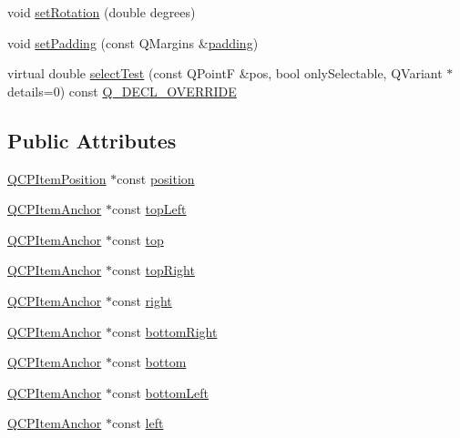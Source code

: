 \begin{DoxyCompactItemize}
\item 
void \mbox{\hyperlink{class_q_c_p_item_text_a4bcc10cd97952c3f749d75824b5077f0}{set\+Rotation}} (double degrees)
\item 
void \mbox{\hyperlink{class_q_c_p_item_text_aeea8a3e01f135f9dd0bb08f51db66310}{set\+Padding}} (const Q\+Margins \&\mbox{\hyperlink{class_q_c_p_item_text_a5a598618350b40446d031fa9dc15fba7}{padding}})
\item 
virtual double \mbox{\hyperlink{class_q_c_p_item_text_a676aaec10ad3cc4d7d0e4847db04c838}{select\+Test}} (const Q\+PointF \&pos, bool only\+Selectable, Q\+Variant $\ast$details=0) const \mbox{\hyperlink{qcustomplot_8h_a42cc5eaeb25b85f8b52d2a4b94c56f55}{Q\+\_\+\+D\+E\+C\+L\+\_\+\+O\+V\+E\+R\+R\+I\+DE}}
\end{DoxyCompactItemize}
\subsection*{Public Attributes}
\begin{DoxyCompactItemize}
\item 
\mbox{\hyperlink{class_q_c_p_item_position}{Q\+C\+P\+Item\+Position}} $\ast$const \mbox{\hyperlink{class_q_c_p_item_text_a0d228a00e819022b5690c65762721129}{position}}
\item 
\mbox{\hyperlink{class_q_c_p_item_anchor}{Q\+C\+P\+Item\+Anchor}} $\ast$const \mbox{\hyperlink{class_q_c_p_item_text_a6354d8762182a3502103fabe5fbb8512}{top\+Left}}
\item 
\mbox{\hyperlink{class_q_c_p_item_anchor}{Q\+C\+P\+Item\+Anchor}} $\ast$const \mbox{\hyperlink{class_q_c_p_item_text_a5c87ee162cbbe3d166b97826c8849304}{top}}
\item 
\mbox{\hyperlink{class_q_c_p_item_anchor}{Q\+C\+P\+Item\+Anchor}} $\ast$const \mbox{\hyperlink{class_q_c_p_item_text_ad18ac45cb4cc135de1eb78f2e86b6504}{top\+Right}}
\item 
\mbox{\hyperlink{class_q_c_p_item_anchor}{Q\+C\+P\+Item\+Anchor}} $\ast$const \mbox{\hyperlink{class_q_c_p_item_text_aef159622ce6502412e782a21ba6d84f2}{right}}
\item 
\mbox{\hyperlink{class_q_c_p_item_anchor}{Q\+C\+P\+Item\+Anchor}} $\ast$const \mbox{\hyperlink{class_q_c_p_item_text_a8ad47045c29af43b0312f7d93bb74374}{bottom\+Right}}
\item 
\mbox{\hyperlink{class_q_c_p_item_anchor}{Q\+C\+P\+Item\+Anchor}} $\ast$const \mbox{\hyperlink{class_q_c_p_item_text_a94aeec080f877d3d1d0c3d8ffc10e9e6}{bottom}}
\item 
\mbox{\hyperlink{class_q_c_p_item_anchor}{Q\+C\+P\+Item\+Anchor}} $\ast$const \mbox{\hyperlink{class_q_c_p_item_text_a6a1c872ad3789ecafcaeac2066e218a0}{bottom\+Left}}
\item 
\mbox{\hyperlink{class_q_c_p_item_anchor}{Q\+C\+P\+Item\+Anchor}} $\ast$const \mbox{\hyperlink{class_q_c_p_item_text_ab8c6c6e1df36256986fab1463c0a1d38}{left}}
\end{DoxyCompactItemize}
